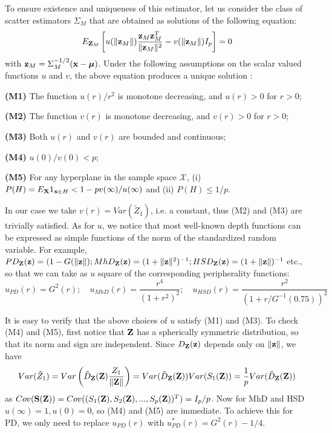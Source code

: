 \documentclass[fleqn,11pt]{article}
\begin{document}
To ensure existence and uniqueness of this estimator, let us consider the class of scatter estimators $\Sigma_M$ that are obtained as solutions of the following equation:
%
\begin{equation}
E_{{\mathbf{Z}}_M} \left[ u( \| {\bf{z}}_M \| )  \frac{{\bf{z}}_M {\bf{z}}_M^T}{\| {\bf{z}}_M \|^2}  - v( \| {\bf{z}}_M \| ) I_p \right] = 0
\end{equation}
%
with ${\bf{z}}_M = \Sigma_M^{-1/2} ({\bf{x}} - {\boldsymbol{\mu}})$. Under the following assumptions on the scalar valued functions $u$ and $v$, the above equation produces a unique solution \citep{HuberBook81}:
%

\vspace{1em}
\noindent\textbf{(M1)} The function $u(r)/r^2$ is monotone decreasing, and $u(r)>0$ for $r>0$;

\noindent\textbf{(M2)}  The function $v(r)$ is monotone decreasing, and $v(r)>0$ for $r>0$;

\noindent\textbf{(M3)} Both $u(r)$ and $v(r)$ are bounded and continuous;

\noindent\textbf{(M4)} $u(0) / v(0) < p$;

\noindent\textbf{(M5)} For any hyperplane in the sample space $\mathcal X$, (i) $P(H) = E_{\mathbf{X}} 1_{{\bf{x}} \in H} < 1 - p v(\infty) / u(\infty)$ and (ii) $P(H) \leq 1/p$.
%

\vspace{1em}
\noindent In our case we take $v(r) = Var(\tilde Z_1)$, i.e. a constant, thus (M2) and (M3) are trivially satisfied. As for $u$, we notice that most well-known depth functions can be expressed as simple functions of the norm of the standardized random variable. For example, $PD_{\mathbf{Z}} ({\bf{z}}) = (1 - G(\| {\bf{z}} \|); MhD_{\mathbf{Z}} ({\bf{z}}) = (1+\| {\bf{z}} \|^2)^{-1}; HSD_{\mathbf{Z}} ({\bf{z}}) = (1+\| {\bf{z}} \|)^{-1}$ etc., so that we can take as $u$ square of the corresponding peripherality functions:
$$
u_{PD} (r) = G^2 (r); \quad u_{MhD}(r)  = \frac{r^4}{(1 + r^2)^2}; \quad u_{HSD}(r)  = \frac{r^2}{(1 + r/G^{-1}(0.75))^2}
$$
%

It is easy to verify that the above choices of $u$ satisfy (M1) and (M3). To check (M4) and (M5), first notice that ${\mathbf{Z}}$ has a spherically symmetric distribution, so that its norm and sign are independent. Since $D_{\mathbf{Z}}({\bf{z}})$ depends only on $\| {\bf{z}} \|$, we have
%
$$
Var (\tilde Z_1) = Var \left( \tilde D_{\mathbf{Z}} ({\mathbf{Z}}) \frac{Z_1}{ \|{\mathbf{Z}} \|} \right) = Var (\tilde D_{\mathbf{Z}} ({\mathbf{Z}})) Var (S_1 ({\mathbf{Z}})) = \frac{1}{p} Var (\tilde D_{\mathbf{Z}} ({\mathbf{Z}}))
$$
%
as $Cov({\mathbf{S}}({\mathbf{Z}})) = Cov((S_1({\mathbf{Z}}), S_2({\mathbf{Z}}), ..., S_p({\mathbf{Z}}))^T) = I_p/p$. Now for MhD and HSD $u(\infty)=1, u(0)=0$, so (M4) and (M5) are immediate. To achieve this for PD, we only need to replace $u_{PD}(r)$ with $u_{PD}^*(r) = G^2(r) - 1/4$.
\end{document}
